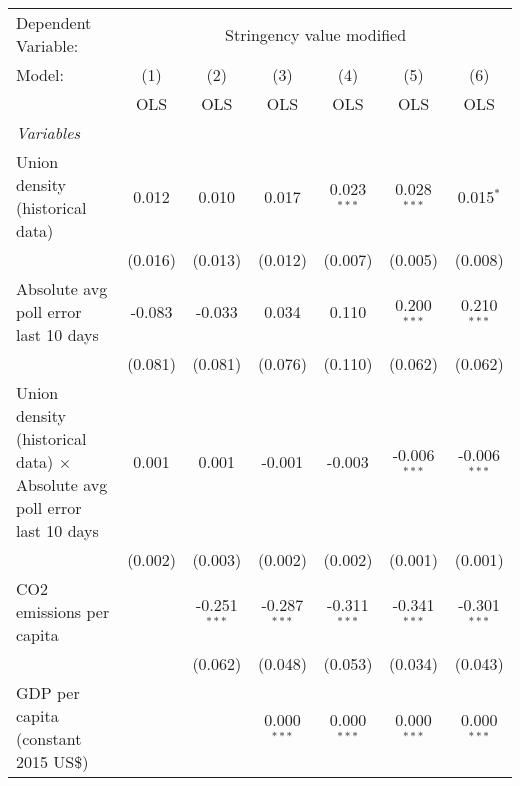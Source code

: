 
\begingroup
\centering
\begin{tabular}{lcccccc}
   \toprule
   Dependent Variable: & \multicolumn{6}{c}{Stringency value modified}\\
   Model:                                                                         & (1)     & (2)            & (3)            & (4)            & (5)            & (6)\\  
                                                                                  &  OLS    & OLS            & OLS            & OLS            & OLS            & OLS\\  
   \midrule
   \emph{Variables}\\
   Union density (historical data)                                                & 0.012   & 0.010          & 0.017          & 0.023$^{***}$  & 0.028$^{***}$  & 0.015$^{*}$\\   
                                                                                  & (0.016) & (0.013)        & (0.012)        & (0.007)        & (0.005)        & (0.008)\\   
   Absolute avg poll error last 10 days                                           & -0.083  & -0.033         & 0.034          & 0.110          & 0.200$^{***}$  & 0.210$^{***}$\\   
                                                                                  & (0.081) & (0.081)        & (0.076)        & (0.110)        & (0.062)        & (0.062)\\   
   Union density (historical data) $\times$ Absolute avg poll error last 10 days  & 0.001   & 0.001          & -0.001         & -0.003         & -0.006$^{***}$ & -0.006$^{***}$\\   
                                                                                  & (0.002) & (0.003)        & (0.002)        & (0.002)        & (0.001)        & (0.001)\\   
   CO2 emissions per capita                                                       &         & -0.251$^{***}$ & -0.287$^{***}$ & -0.311$^{***}$ & -0.341$^{***}$ & -0.301$^{***}$\\   
                                                                                  &         & (0.062)        & (0.048)        & (0.053)        & (0.034)        & (0.043)\\   
   GDP per capita (constant 2015 US\$)                                            &         &                & 0.000$^{***}$  & 0.000$^{***}$  & 0.000$^{***}$  & 0.000$^{***}$\\   

\end{tabular}
